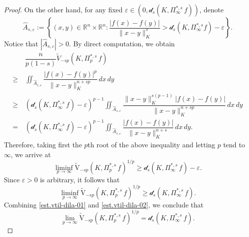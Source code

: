 \documentclass[11pt, reqno]{article}
\theoremstyle{definition}
\numberwithin{equation}{section}
\newcommand{\R}{\mathbb{R}}
\newcommand{\vtil}{\widetilde{\mathrm{V}}}
\newcommand{\dila}{\mathscr{d}}
\begin{document}
\begin{proof}
\medskip

On the other hand, for any fixed $\varepsilon \in (0, \dila_s(K, \Pi^{\ast, s}_\infty \, f))$, denote
    \begin{equation}\label{A_hat}
        \widehat A_{s, \varepsilon} 
        :=
		\left\{ 
		(x, y) \in \R^n \times \R^n :
		\dfrac{|f(x) - f(y)|}{\| x - y \|_K^s}
		> 
		\dila_s(K, \Pi^{\ast, s}_\infty f) - \varepsilon
		\right\}.
   \end{equation}
Notice that $|\widehat{A}_{s, \varepsilon}| > 0$.
By direct computation, we obtain
    \begin{equation}\label{est.A_hat}
    	\begin{split} 
         & ~  \dfrac{n}{p(1 - s)} \widetilde V_{-sp}(K, \Pi^{\ast, s}_p \, f) \\
          \geq &  ~  
          \iint_{\widehat A_{s, \varepsilon}} \dfrac{|f(x) - f(y)|^p}{\| x - y \|_K^{n + sp}} \, dx \, dy \\
         \geq & ~
         \left( \dila_s(K, \Pi^{\ast, s}_\infty \, f) - \varepsilon \right)^{p - 1} 
         \iint_{\widehat A_{s,\varepsilon}}\dfrac{\| x - y \|^{s(p - 1)}_K |f(x) - f(y)|}{\| x - y \|^{n + sp}_K } \,dx\,dy  \\
         = & ~ 
        \left( \dila_s(K, \Pi^{\ast, s}_\infty \, f) - \varepsilon \right)^{p - 1} 
        \iint_{\widehat A_{s, \varepsilon}} \dfrac{|f(x) - f(y)|}{\|x - y\|^{n + s}_K } \,dx\,dy.
         \end{split}
    \end{equation}
Therefore, taking first the $p$th root of the above inequality and letting $p$ tend to $\infty$, we arrive at
\[
        \liminf_{p \to \infty} \vtil_{-sp}(K, \Pi^{\ast, s}_p \, f)^{1/p} \geq \dila_s(K, \Pi^{\ast, s}_\infty \, f) - \varepsilon.
    \]
Since $\varepsilon > 0$ is arbitrary, it follows that
    \begin{equation}\label{est.vtil-dila-02}
        \liminf_{p \to \infty} \vtil_{-sp}(K, \Pi^{\ast, s}_p \, f)^{1/p} \geq \dila_s(K, \Pi^{\ast, s}_\infty \, f).
    \end{equation}
Combining \eqref{est.vtil-dila-01} and \eqref{est.vtil-dila-02}, we conclude that 
\[
\textstyle\lim_{p \to \infty} \vtil_{-sp}(K, \Pi^{\ast, s}_p \, f)^{1/p} = \dila_s(K, \Pi^{\ast, s}_\infty \, f).
\]

\medskip


\end{proof}
\end{document}
